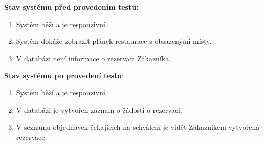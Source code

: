\textbf{Stav systému před provedením testu:}
\begin{enumerate}
	\item Systém běží a je responzivní.
	\item Systém dokáže zobrazit plánek restaurace s obsazenými místy.
	\item V databázi není informace o rezervaci Zákazníka. 
\end{enumerate}

\textbf{Stav systému po provedení testu}:
\begin{enumerate}
	\item Systém běží a je responzivní.
	\item V databázi je vytvořen záznam o žádosti o rezervaci.
	\item V seznamu objednávek čekajících na schválení je vidět Zákazníkem vytvořená rezervace.
\end{enumerate}

